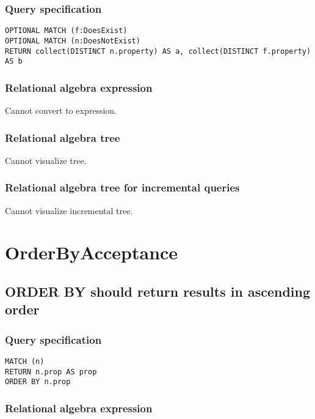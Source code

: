 \subsubsection*{Query specification}

\begin{lstlisting}
OPTIONAL MATCH (f:DoesExist)
OPTIONAL MATCH (n:DoesNotExist)
RETURN collect(DISTINCT n.property) AS a, collect(DISTINCT f.property) AS b
\end{lstlisting}

\subsubsection*{Relational algebra expression}

Cannot convert to expression.

\subsubsection*{Relational algebra tree}

Cannot visualize tree.

\subsubsection*{Relational algebra tree for incremental queries}

Cannot visualize incremental tree.

\section{OrderByAcceptance}

\subsection{ORDER BY should return results in ascending order}

\subsubsection*{Query specification}

\begin{lstlisting}
MATCH (n)
RETURN n.prop AS prop
ORDER BY n.prop
\end{lstlisting}

\subsubsection*{Relational algebra expression}

